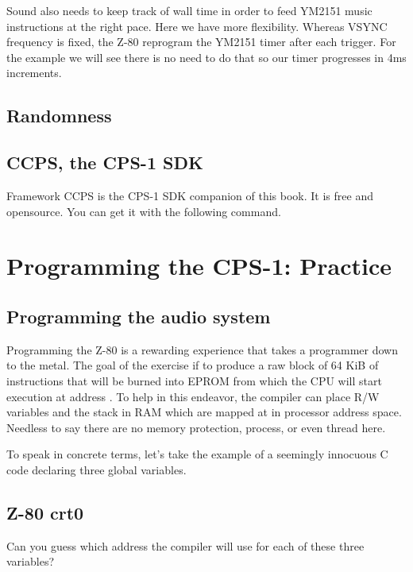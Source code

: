 Sound also needs to keep track of wall time in order to feed YM2151 music instructions at the right pace. Here we have more flexibility. Whereas VSYNC frequency is fixed,  the Z-80 reprogram the YM2151 timer after each trigger. For the example we will see there is no need to do that so our timer progresses in 4ms increments.

\section{Randomness}

\section{CCPS, the CPS-1 SDK}
Framework CCPS is the CPS-1 SDK companion of this book. It is free and opensource. You can get it with the following command.




\chapter{Programming the CPS-1: Practice}


\section{Programming the audio system}
Programming the Z-80 is a rewarding experience that takes a programmer down to the metal. The goal of the exercise if to produce a raw block of 64 KiB of instructions that will be burned into EPROM from which the CPU will start execution at address . To help in this endeavor, the compiler can place R/W variables and the stack in RAM which are mapped at  in processor address space. Needless to say there are no memory protection, process, or even thread here.




To speak in concrete terms, let's take the example of a seemingly innocuous C code declaring three global variables.

\section{Z-80 crt0}



Can you guess which address the compiler will use for each of these three variables?

